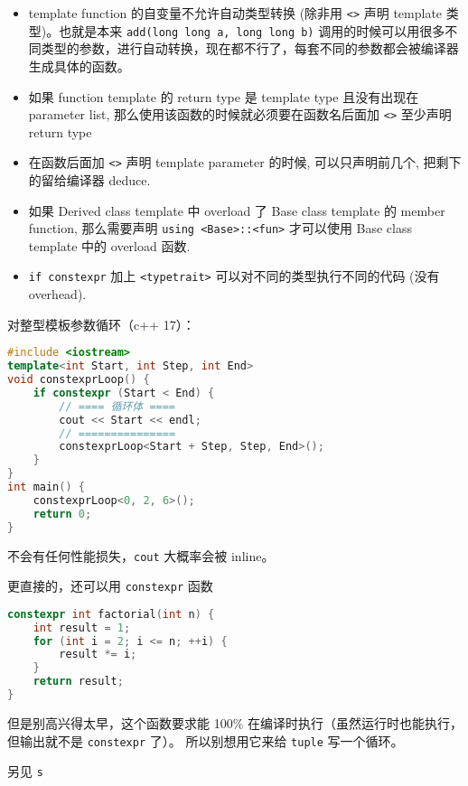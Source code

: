 
\begin{issues}
\issueDraft
\end{issues}

\begin{itemize}
\item template function 的自变量不允许自动类型转换 (除非用 \verb`<>` 声明 template 类型)。也就是本来 \verb`add(long long a, long long b)` 调用的时候可以用很多不同类型的参数，进行自动转换，现在都不行了，每套不同的参数都会被编译器生成具体的函数。
\item 如果 function template 的 return type 是 template type 且没有出现在 parameter list, 那么使用该函数的时候就必须要在函数名后面加 \verb`<>` 至少声明 return type
\item 在函数后面加 \verb`<>` 声明 template parameter 的时候, 可以只声明前几个, 把剩下的留给编译器 deduce.
\item 如果 Derived class template 中 overload 了 Base class template 的 member function, 那么需要声明 \verb`using <Base>::<fun>` 才可以使用 Base class template 中的 overload 函数.
\item \verb`if constexpr` 加上 \verb`<typetrait>` 可以对不同的类型执行不同的代码 (没有 overhead).
\end{itemize}

对整型模板参数循环（c++ 17）：
\begin{lstlisting}[language=cpp]
#include <iostream>
template<int Start, int Step, int End>
void constexprLoop() {
    if constexpr (Start < End) {
		// ==== 循环体 ====
        cout << Start << endl;
		// ===============
        constexprLoop<Start + Step, Step, End>();
    }
}
int main() {
    constexprLoop<0, 2, 6>();
    return 0;
}
\end{lstlisting}
不会有任何性能损失，\verb`cout` 大概率会被 inline。

更直接的，还可以用 \verb`constexpr` 函数
\begin{lstlisting}[language=cpp]
constexpr int factorial(int n) {
    int result = 1;
    for (int i = 2; i <= n; ++i) {
        result *= i;
    }
    return result;
}
\end{lstlisting}
但是别高兴得太早，这个函数要求能 100\% 在编译时执行（虽然运行时也能执行，但输出就不是 \verb`constexpr` 了）。 所以别想用它来给 \verb`tuple` 写一个循环。

另见 \verb`s`

